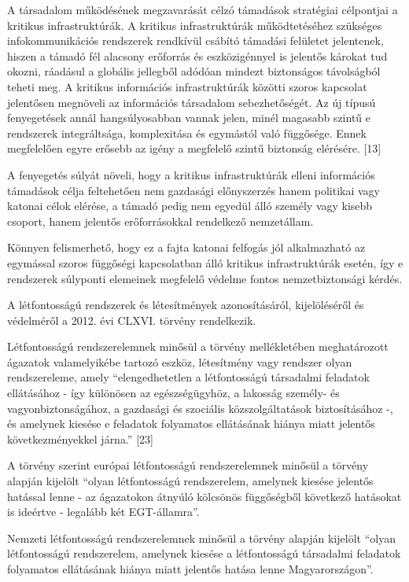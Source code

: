 \documentclass[12pt,magyar,a4paper,oneside]{scrreprt}
\begin{document}
A társadalom működésének megzavarását célzó támadások stratégiai
célpontjai a kritikus infrastruktúrák. A kritikus infrastruktúrák
működtetéséhez szükséges infokommunikációs rendszerek rendkívül csábító
támadási felületet jelentenek, hiszen a támadó fél alacsony erőforrás és
eszközigénnyel is jelentős károkat tud okozni, ráadásul a globális
jellegből adódóan mindezt biztonságos távolságból teheti meg. A kritikus
információs infrastruktúrák közötti szoros kapcsolat jelentősen
megnöveli az információs társadalom sebezhetőségét. Az új típusú
fenyegetések annál hangsúlyosabban vannak jelen, minél magasabb szintű e
rendszerek integráltsága, komplexitása és egymástól való függősége.
Ennek megfelelően egyre erősebb az igény a megfelelő szintű biztonság
elérésére. {[}13{]}

A fenyegetés súlyát növeli, hogy a kritikus infrastruktúrák elleni
információs támadások célja feltehetően nem gazdasági előnyszerzés hanem
politikai vagy katonai célok elérése, a támadó pedig nem egyedül álló
személy vagy kisebb csoport, hanem jelentős erőforrásokkal rendelkező
nemzetállam.

Könnyen felismerhető, hogy ez a fajta katonai felfogás jól alkalmazható
az egymással szoros függőségi kapcsolatban álló kritikus infrastruktúrák
esetén, így e rendszerek súlyponti elemeinek megfelelő védelme fontos
nemzetbiztonsági kérdés.

A létfontosságú rendszerek és létesítmények azonosításáról,
kijelöléséről és védelméről a 2012. évi CLXVI. törvény rendelkezik.

Létfontosságú rendszerelemnek minősül a törvény mellékletében
meghatározott ágazatok valamelyikébe tartozó eszköz, létesítmény vagy
rendszer olyan rendszereleme, amely ``elengedhetetlen a létfontosságú
társadalmi feladatok ellátásához - így különösen az egészségügyhöz, a
lakosság személy- és vagyonbiztonságához, a gazdasági és szociális
közszolgáltatások biztosításához -, és amelynek kiesése e feladatok
folyamatos ellátásának hiánya miatt jelentős következményekkel járna.''
{[}23{]}

A törvény szerint európai létfontosságú rendszerelemnek minősül a
törvény alapján kijelölt ``olyan létfontosságú rendszerelem, amelynek
kiesése jelentős hatással lenne - az ágazatokon átnyúló kölcsönös
függőségből következő hatásokat is ideértve - legalább két
EGT-államra''.

Nemzeti létfontosságú rendszerelemnek minősül a törvény alapján kijelölt
``olyan létfontosságú rendszerelem, amelynek kiesése a létfontosságú
társadalmi feladatok folyamatos ellátásának hiánya miatt jelentős hatása
lenne Magyarországon''.
\end{document}
